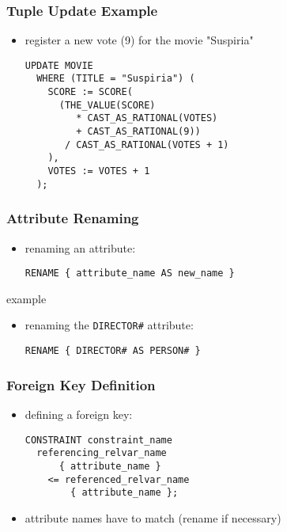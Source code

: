\documentclass[dvipsnames]{beamer}
\theoremstyle{plain}
\begin{document}
\begin{frame}[fragile]
  \frametitle{Tuple Update Example}

  \begin{itemize}
    \item register a new vote (9) for the movie "Suspiria"
    \begin{lstlisting}
UPDATE MOVIE
  WHERE (TITLE = "Suspiria") (
    SCORE := SCORE(
      (THE_VALUE(SCORE)
         * CAST_AS_RATIONAL(VOTES)
         + CAST_AS_RATIONAL(9))
       / CAST_AS_RATIONAL(VOTES + 1)
    ),
    VOTES := VOTES + 1
  );
    \end{lstlisting}
  \end{itemize}
\end{frame}

\begin{frame}[fragile]
  \frametitle{Attribute Renaming}

  \begin{itemize}
    \item renaming an attribute:
    \begin{lstlisting}
RENAME { attribute_name AS new_name }
    \end{lstlisting}
  \end{itemize}

  \medskip
  \begin{exampleblock}{example}
    \begin{itemize}
      \item renaming the \texttt{DIRECTOR\#} attribute:
      \begin{lstlisting}
RENAME { DIRECTOR# AS PERSON# }
      \end{lstlisting}
    \end{itemize}
  \end{exampleblock}
\end{frame}

\begin{frame}[fragile]
  \frametitle{Foreign Key Definition}

  \begin{itemize}
    \item defining a foreign key:
    \begin{lstlisting}
CONSTRAINT constraint_name
  referencing_relvar_name
      { attribute_name }
    <= referenced_relvar_name
        { attribute_name };
    \end{lstlisting}

    \item attribute names have to match (rename if necessary)
  \end{itemize}
\end{frame}
\end{document}
